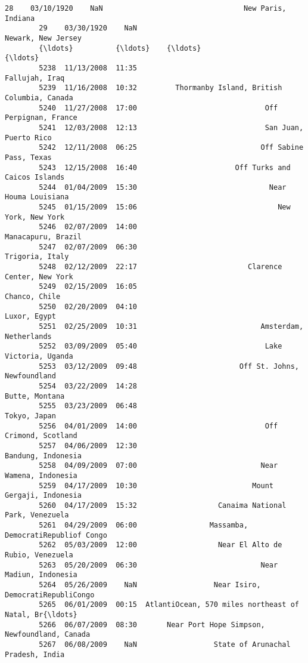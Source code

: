 \documentclass[11pt]{article}
\begin{document}
\begin{Verbatim}[commandchars=\\\{\}]
        28    03/10/1920    NaN                                 New Paris, Indiana   
        29    03/30/1920    NaN                                 Newark, New Jersey   
        {\ldots}          {\ldots}    {\ldots}                                                {\ldots}   
        5238  11/13/2008  11:35                                     Fallujah, Iraq   
        5239  11/16/2008  10:32         Thormanby Island, British Columbia, Canada   
        5240  11/27/2008  17:00                              Off Perpignan, France   
        5241  12/03/2008  12:13                              San Juan, Puerto Rico   
        5242  12/11/2008  06:25                             Off Sabine Pass, Texas   
        5243  12/15/2008  16:40                       Off Turks and Caicos Islands   
        5244  01/04/2009  15:30                               Near Houma Louisiana   
        5245  01/15/2009  15:06                                 New York, New York   
        5246  02/07/2009  14:00                                 Manacapuru, Brazil   
        5247  02/07/2009  06:30                                    Trigoria, Italy   
        5248  02/12/2009  22:17                          Clarence Center, New York   
        5249  02/15/2009  16:05                                      Chanco, Chile   
        5250  02/20/2009  04:10                                       Luxor, Egypt   
        5251  02/25/2009  10:31                             Amsterdam, Netherlands   
        5252  03/09/2009  05:40                              Lake Victoria, Uganda   
        5253  03/12/2009  09:48                        Off St. Johns, Newfoundland   
        5254  03/22/2009  14:28                                     Butte, Montana   
        5255  03/23/2009  06:48                                       Tokyo, Japan   
        5256  04/01/2009  14:00                              Off Crimond, Scotland   
        5257  04/06/2009  12:30                                 Bandung, Indonesia   
        5258  04/09/2009  07:00                             Near Wamena, Indonesia   
        5259  04/17/2009  10:30                           Mount Gergaji, Indonesia   
        5260  04/17/2009  15:32                   Canaima National Park, Venezuela   
        5261  04/29/2009  06:00                 Massamba, DemocratiRepubliof Congo   
        5262  05/03/2009  12:00                   Near El Alto de Rubio, Venezuela   
        5263  05/20/2009  06:30                             Near Madiun, Indonesia   
        5264  05/26/2009    NaN                  Near Isiro, DemocratiRepubliCongo   
        5265  06/01/2009  00:15  AtlantiOcean, 570 miles northeast of Natal, Br{\ldots}   
        5266  06/07/2009  08:30       Near Port Hope Simpson, Newfoundland, Canada   
        5267  06/08/2009    NaN                  State of Arunachal Pradesh, India   
        

\end{Verbatim}
\end{document}
